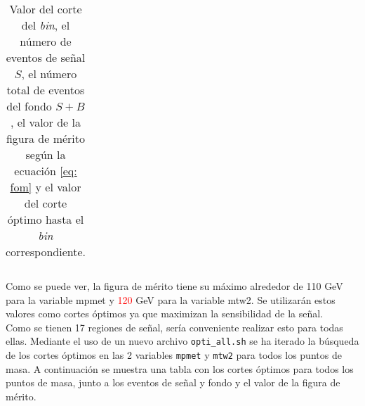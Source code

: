\begin{table}[h!]
\begin{tabular}{ |c|c|c|c|c| }
\end{tabular}
\caption{Valor del corte del \textit{bin}, el número de eventos de señal $S$, el número total de eventos del fondo $S+B$, el valor de la figura de mérito según la ecuación \ref{eq: fom} y el valor del corte óptimo hasta el \textit{bin} correspondiente.}
\label{tab:fom_binxbin_tttDM_1_100}
\end{table}


Como se puede ver, la figura de mérito tiene su máximo alrededor de 110 GeV para la variable mpmet y \textcolor{red}{120} GeV para la variable mtw2. Se utilizarán estos valores como cortes óptimos ya que maximizan la sensibilidad de la señal.\\


Como se tienen 17 regiones de señal, sería conveniente realizar esto para todas ellas. Mediante el uso de un nuevo archivo \texttt{opti\_all.sh} se ha iterado la búsqueda de los cortes óptimos en las 2 variables \texttt{mpmet} y \texttt{mtw2} para todos los puntos de masa. A continuación se muestra una tabla con los cortes óptimos para todos los puntos de masa, junto a los eventos de señal y fondo y el valor de la figura de mérito.
\newpage

